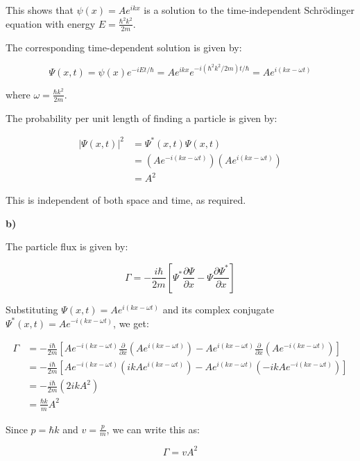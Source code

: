 \documentclass{article}
\begin{document}
This shows that $\psi(x) = Ae^{ikx}$ is a solution to the time-independent Schrödinger equation with energy $E = \frac{\hbar^2 k^2}{2m}$.

The corresponding time-dependent solution is given by:

\begin{equation*}
\Psi(x,t) = \psi(x) e^{-iEt/\hbar} = Ae^{ikx} e^{-i(\hbar^2 k^2 / 2m)t/\hbar} = Ae^{i(kx - \omega t)}
\end{equation*}

where $\omega = \frac{\hbar k^2}{2m}$.

The probability per unit length of finding a particle is given by:

\begin{align*}
|\Psi(x,t)|^2 &= \Psi^*(x,t) \Psi(x,t) \\
&= (Ae^{-i(kx - \omega t)})(Ae^{i(kx - \omega t)}) \\
&= A^2
\end{align*}

This is independent of both space and time, as required.

\textbf{b)} 

The particle flux is given by:

\begin{equation*}
\Gamma = -\frac{i \hbar}{2m} \left[ \Psi^* \frac{\partial \Psi}{\partial x} - \Psi \frac{\partial \Psi^*}{\partial x} \right]
\end{equation*}

Substituting $\Psi(x,t) = Ae^{i(kx - \omega t)}$ and its complex conjugate $\Psi^*(x,t) = Ae^{-i(kx - \omega t)}$, we get:

\begin{align*}
\Gamma &= -\frac{i \hbar}{2m} \left[ Ae^{-i(kx - \omega t)} \frac{\partial}{\partial x} (Ae^{i(kx - \omega t)}) - Ae^{i(kx - \omega t)} \frac{\partial}{\partial x} (Ae^{-i(kx - \omega t)}) \right] \\
&= -\frac{i \hbar}{2m} \left[ Ae^{-i(kx - \omega t)} (ikAe^{i(kx - \omega t)}) - Ae^{i(kx - \omega t)} (-ikAe^{-i(kx - \omega t)}) \right] \\
&= -\frac{i \hbar}{2m} (2ikA^2) \\
&= \frac{\hbar k}{m} A^2
\end{align*}

Since $p = \hbar k$ and $v = \frac{p}{m}$, we can write this as:

\begin{equation*}
\Gamma = v A^2
\end{equation*}
\end{document}
